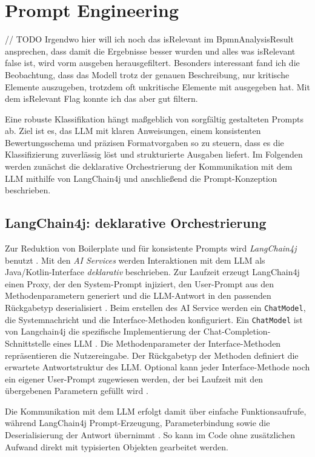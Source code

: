 \section{Prompt Engineering}\label{sec:prompt-engineering}

// TODO Irgendwo hier will ich noch das isRelevant im BpmnAnalysisResult ansprechen, dass damit die Ergebnisse besser wurden und alles was isRelevant false ist, wird vorm ausgeben herausgefiltert. Besonders interessant fand ich die Beobachtung, dass das Modell trotz der genauen Beschreibung, nur kritische Elemente auszugeben, trotzdem oft unkritische Elemente mit ausgegeben hat. Mit dem isRelevant Flag konnte ich das aber gut filtern.

Eine robuste Klassifikation hängt maßgeblich von sorgfältig gestalteten Prompts ab. Ziel ist es, das \ac{LLM} mit klaren Anweisungen, einem konsistenten Bewertungsschema und präzisen Formatvorgaben so zu steuern, dass es die Klassifizierung zuverlässig löst und strukturierte Ausgaben liefert. Im Folgenden werden zunächst die deklarative Orchestrierung der Kommunikation mit dem \ac{LLM} mithilfe von LangChain4j und anschließend die Prompt-Konzeption beschrieben.

\subsection*{LangChain4j: deklarative Orchestrierung}
Zur Reduktion von Boilerplate und für konsistente Prompts wird \emph{LangChain4j} benutzt \cite{langchain4j}. Mit den \emph{AI Services} werden Interaktionen mit dem \ac{LLM} als Java/Kotlin-Interface \emph{deklarativ} beschrieben. Zur Laufzeit erzeugt LangChain4j einen Proxy, der den System-Prompt injiziert, den User-Prompt aus den Methodenparametern generiert und die \ac{LLM}-Antwort in den passenden Rückgabetyp deserialisiert \cite{langchain4j-ai-services}. Beim erstellen des AI Service werden ein \texttt{ChatModel}, die Systemnachricht und die Interface-Methoden konfiguriert. Ein \texttt{ChatModel} ist von Langchain4j die spezifische Implementierung der Chat-Completion-Schnittstelle eines \ac{LLM} \cite{langchain4j-chat-model}. Die Methodenparameter der Interface-Methoden repräsentieren die Nutzereingabe. Der Rückgabetyp der Methoden definiert die erwartete Antwortstruktur des \ac{LLM}. Optional kann jeder Interface-Methode noch ein eigener User-Prompt zugewiesen werden, der bei Laufzeit mit den übergebenen Parametern gefüllt wird \cite{langchain4j-ai-services}.

Die Kommunikation mit dem \ac{LLM} erfolgt damit über einfache Funktionsaufrufe, während LangChain4j Prompt-Erzeugung, Parameterbindung sowie die Deserialisierung der Antwort übernimmt \cite{langchain4j-ai-services}. So kann im Code ohne zusätzlichen Aufwand direkt mit typisierten Objekten gearbeitet werden.

